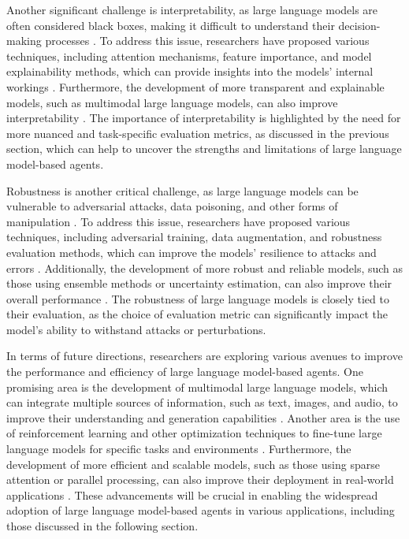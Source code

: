 \documentclass[11pt,a4paper]{article}
\begin{document}
Another significant challenge is interpretability, as large language models are often considered black boxes, making it difficult to understand their decision-making processes \cite{doi:10.1016/j.tics.2023.08.006}. To address this issue, researchers have proposed various techniques, including attention mechanisms, feature importance, and model explainability methods, which can provide insights into the models' internal workings \cite{arxiv:2309.02427}. Furthermore, the development of more transparent and explainable models, such as multimodal large language models, can also improve interpretability \cite{arxiv:2401.13601}. The importance of interpretability is highlighted by the need for more nuanced and task-specific evaluation metrics, as discussed in the previous section, which can help to uncover the strengths and limitations of large language model-based agents.

Robustness is another critical challenge, as large language models can be vulnerable to adversarial attacks, data poisoning, and other forms of manipulation \cite{doi:10.1145/3637528.3671650}. To address this issue, researchers have proposed various techniques, including adversarial training, data augmentation, and robustness evaluation methods, which can improve the models' resilience to attacks and errors \cite{doi:10.18653/v1/2023.acl-long.411}. Additionally, the development of more robust and reliable models, such as those using ensemble methods or uncertainty estimation, can also improve their overall performance \cite{doi:10.1145/3748302}. The robustness of large language models is closely tied to their evaluation, as the choice of evaluation metric can significantly impact the model's ability to withstand attacks or perturbations.

In terms of future directions, researchers are exploring various avenues to improve the performance and efficiency of large language model-based agents. One promising area is the development of multimodal large language models, which can integrate multiple sources of information, such as text, images, and audio, to improve their understanding and generation capabilities \cite{doi:10.1109/bigdata59044.2023.10386743}. Another area is the use of reinforcement learning and other optimization techniques to fine-tune large language models for specific tasks and environments \cite{doi:10.1109/tnnls.2024.3497992}. Furthermore, the development of more efficient and scalable models, such as those using sparse attention or parallel processing, can also improve their deployment in real-world applications \cite{doi:10.1145/3754448}. These advancements will be crucial in enabling the widespread adoption of large language model-based agents in various applications, including those discussed in the following section.
\end{document}
